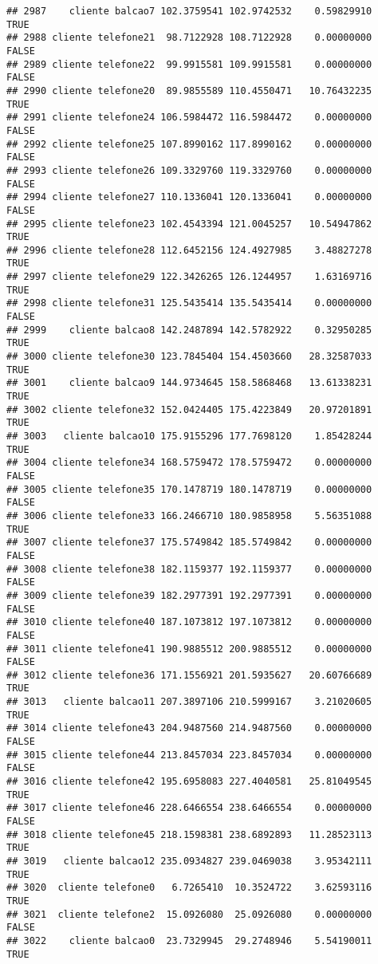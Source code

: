 \documentclass[
]{article}
\begin{document}
\begin{verbatim}
## 2987    cliente balcao7 102.3759541 102.9742532    0.59829910     TRUE
## 2988 cliente telefone21  98.7122928 108.7122928    0.00000000    FALSE
## 2989 cliente telefone22  99.9915581 109.9915581    0.00000000    FALSE
## 2990 cliente telefone20  89.9855589 110.4550471   10.76432235     TRUE
## 2991 cliente telefone24 106.5984472 116.5984472    0.00000000    FALSE
## 2992 cliente telefone25 107.8990162 117.8990162    0.00000000    FALSE
## 2993 cliente telefone26 109.3329760 119.3329760    0.00000000    FALSE
## 2994 cliente telefone27 110.1336041 120.1336041    0.00000000    FALSE
## 2995 cliente telefone23 102.4543394 121.0045257   10.54947862     TRUE
## 2996 cliente telefone28 112.6452156 124.4927985    3.48827278     TRUE
## 2997 cliente telefone29 122.3426265 126.1244957    1.63169716     TRUE
## 2998 cliente telefone31 125.5435414 135.5435414    0.00000000    FALSE
## 2999    cliente balcao8 142.2487894 142.5782922    0.32950285     TRUE
## 3000 cliente telefone30 123.7845404 154.4503660   28.32587033     TRUE
## 3001    cliente balcao9 144.9734645 158.5868468   13.61338231     TRUE
## 3002 cliente telefone32 152.0424405 175.4223849   20.97201891     TRUE
## 3003   cliente balcao10 175.9155296 177.7698120    1.85428244     TRUE
## 3004 cliente telefone34 168.5759472 178.5759472    0.00000000    FALSE
## 3005 cliente telefone35 170.1478719 180.1478719    0.00000000    FALSE
## 3006 cliente telefone33 166.2466710 180.9858958    5.56351088     TRUE
## 3007 cliente telefone37 175.5749842 185.5749842    0.00000000    FALSE
## 3008 cliente telefone38 182.1159377 192.1159377    0.00000000    FALSE
## 3009 cliente telefone39 182.2977391 192.2977391    0.00000000    FALSE
## 3010 cliente telefone40 187.1073812 197.1073812    0.00000000    FALSE
## 3011 cliente telefone41 190.9885512 200.9885512    0.00000000    FALSE
## 3012 cliente telefone36 171.1556921 201.5935627   20.60766689     TRUE
## 3013   cliente balcao11 207.3897106 210.5999167    3.21020605     TRUE
## 3014 cliente telefone43 204.9487560 214.9487560    0.00000000    FALSE
## 3015 cliente telefone44 213.8457034 223.8457034    0.00000000    FALSE
## 3016 cliente telefone42 195.6958083 227.4040581   25.81049545     TRUE
## 3017 cliente telefone46 228.6466554 238.6466554    0.00000000    FALSE
## 3018 cliente telefone45 218.1598381 238.6892893   11.28523113     TRUE
## 3019   cliente balcao12 235.0934827 239.0469038    3.95342111     TRUE
## 3020  cliente telefone0   6.7265410  10.3524722    3.62593116     TRUE
## 3021  cliente telefone2  15.0926080  25.0926080    0.00000000    FALSE
## 3022    cliente balcao0  23.7329945  29.2748946    5.54190011     TRUE

\end{verbatim}
\end{document}
